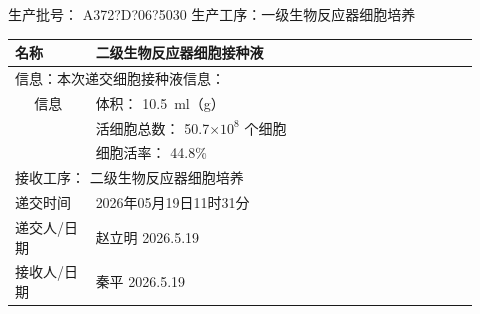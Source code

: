 \documentclass[UTF8,10pt,a4paper,fontset=fandol]{ctexart}
\newcommand{\fieldvalue}[1]{#1}
\newcommand{\handwritten}[1]{#1}
\begin{document}
\noindent
生产批号：
\fieldvalue{\handwritten{A372?D?06?5030}}
\hfill
生产工序：一级生物反应器细胞培养

\vspace{0.5em}

\begin{center}
\begin{tabular}{|p{0.16\linewidth}|p{0.76\linewidth}|}
\hline
名称 &
\fieldvalue{二级生物反应器细胞接种液}
\\ \hline

\multicolumn{2}{|l|}{信息：本次递交细胞接种液信息：}
\\ \hline

\multicolumn{1}{|c|}{信息} &
体积：
\fieldvalue{\handwritten{10.5}}\ ml（g）
\\[-0.2em]
&
活细胞总数：
\fieldvalue{\handwritten{50.7}}\(\times 10^{8}\) 个细胞
\\[-0.2em]
&
细胞活率：
\fieldvalue{\handwritten{44.8}}\%
\\ \hline

\multicolumn{2}{|l|}{接收工序：
\fieldvalue{二级生物反应器细胞培养}
}
\\ \hline

递交时间 &
\fieldvalue{\handwritten{2026年05月19日11时31分}}
\\ \hline

递交人/日期 &
\fieldvalue{\handwritten{赵立明}}
\qquad
\fieldvalue{\handwritten{2026.5.19}}
\\ \hline

接收人/日期 &
\fieldvalue{\handwritten{秦平}}
\qquad
\fieldvalue{\handwritten{2026.5.19}}
\\ \hline
\end{tabular}
\end{center}
\end{document}
